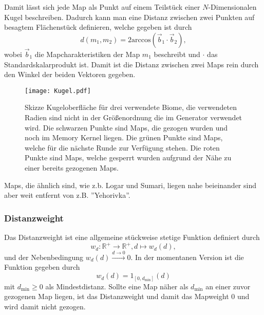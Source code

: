             Damit lässt sich jede Map als Punkt auf einem Teilstück einer $N$-Dimensionalen Kugel beschreiben. 
            Dadurch kann man eine Distanz zwischen zwei Punkten auf besagtem Flächenstück definieren, welche gegeben ist durch 
            \begin{equation}
                d(m_1, m_2) = 2\text{arccos}(\vec{b}_1\cdot\vec{b}_2),
            \end{equation}
            wobei $\vec{b}_1$ die Mapcharakteristiken der Map $m_1$ beschreibt und $\cdot$ das Standardskalarprodukt ist.
            Damit ist die Distanz zwischen zwei Maps rein durch den Winkel der beiden Vektoren gegeben. 
            \begin{figure}[htbp]
                \centering
                \texttt{[image: Kugel.pdf]}
                \caption{Skizze Kugeloberfläche für drei verwendete Biome, die verwendeten Radien sind nicht in der Größenordnung die im Generator verwendet wird. 
                            Die schwarzen Punkte sind Maps, die gezogen wurden und noch im Memory Kernel liegen. 
                            Die grünen Punkte sind Maps, welche für die nächste Runde zur Verfügung stehen.
                            Die roten Punkte sind Maps, welche gesperrt wurden aufgrund der Nähe zu einer bereits gezogenen Maps.}
            \end{figure}
            Maps, die ähnlich sind, wie z.b. \glqq{}Logar\grqq{} und \glqq{}Sumari\grqq{}, liegen nahe beieinander sind aber weit entfernt von z.B. ''Yehorivka''.
        \subsubsection{Distanzweight}
            Das Distanzweight ist eine allgemeine stückweise stetige Funktion definiert durch
            \begin{equation}
                w_d : \mathbb{R}^+ \rightarrow \mathbb{R}^+, d \mapsto w_d(d),
            \end{equation}
            und der Nebenbedingung $w_d(d)\overset{d\rightarrow 0}{\longrightarrow}0$.
            In der momentanen Version ist die Funktion gegeben durch
            \begin{equation}
                w_d(d) = 1_{[0,d_\text{min}]}(d)
            \end{equation}
            mit $d_\text{min}\geq 0$ als Mindestdistanz. 
            Sollte eine Map näher als $d_\text{min}$ an einer zuvor gezogenen Map liegen, ist das Distanzweight und damit das Mapweight $0$ und wird damit nicht gezogen.        
